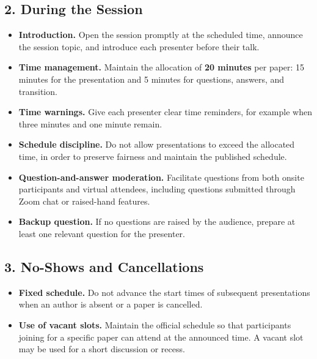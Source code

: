 \documentclass[10pt,a4paper]{article}
\begin{document}
\vspace{0.8em}

\subsection*{\color{conf}2. During the Session}

\begin{itemize}[leftmargin=*, noitemsep]
    \item \textbf{Introduction.} Open the session promptly at the scheduled time,
    announce the session topic, and introduce each presenter before their talk.

    \item \textbf{Time management.} Maintain the allocation of \textbf{20 minutes}
    per paper: 15 minutes for the presentation and 5 minutes for questions,
    answers, and transition.

    \item \textbf{Time warnings.} Give each presenter clear time reminders, for
    example when three minutes and one minute remain.

    \item \textbf{Schedule discipline.} Do not allow presentations to exceed the
    allocated time, in order to preserve fairness and maintain the published
    schedule.

    \item \textbf{Question-and-answer moderation.} Facilitate questions from both
    onsite participants and virtual attendees, including questions submitted
    through Zoom chat or raised-hand features.

    \item \textbf{Backup question.} If no questions are raised by the audience,
    prepare at least one relevant question for the presenter.
\end{itemize}

\vspace{0.8em}

\subsection*{\color{conf}3. No-Shows and Cancellations}

\begin{itemize}[leftmargin=*, noitemsep]
    \item \textbf{Fixed schedule.} Do not advance the start times of subsequent
    presentations when an author is absent or a paper is cancelled.

    \item \textbf{Use of vacant slots.} Maintain the official schedule so that
    participants joining for a specific paper can attend at the announced time.
    A vacant slot may be used for a short discussion or recess.
\end{itemize}
\end{document}
